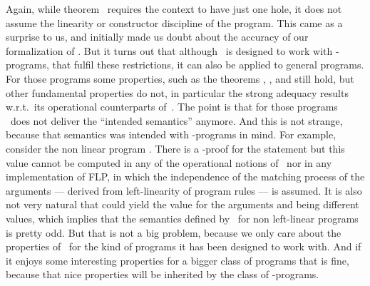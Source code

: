 \documentclass{llncs}
\begin{document}
Again, while theorem~ requires the context to have just
one hole, it does not assume the linearity or constructor discipline
of the program. This came as a surprise to us, and initially made us
doubt about the accuracy of our formalization of \crwl. But it turns
out that although \crwl\ is designed to work with \crwl-programs, that
fulfil these restrictions, it can also be applied to general programs.
For those programs some properties, such as the theorems
, , and
 still hold, but other fundamental properties do
not, in particular the strong adequacy results w.r.t.\ its operational
counterparts of~\cite{GHLR99,ppdp2007,AHHOV05}.
The point is that for those programs \crwl\ does not deliver the
``intended semantics'' anymore. And this is not strange, because that semantics was intended
with \crwl-programs in mind.
For example, consider the non linear
program . There is a \crwl-proof for the statement  but this value cannot be computed in any of the operational notions
of~\cite{GHLR99,ppdp2007,AHHOV05} nor in any implementation of FLP, in
which the independence of the matching process of the arguments --- derived from left-linearity of program rules --- is
assumed. It is also not very natural that  could yield the value  for the arguments  and  being different values, which implies that the semantics defined by \crwl\ for non left-linear programs is pretty odd. But that is not a big problem, because we only care about the properties of \crwl\ for the kind of programs it has been designed to work with. And if it enjoys some interesting properties for a bigger class of programs that is fine, because that nice properties will be inherited by the class of \crwl-programs.
\end{document}

